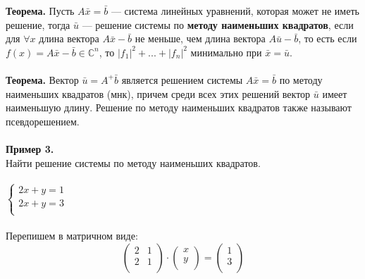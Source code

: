 \documentclass[12pt]{article}
\theoremstyle{definition}
\numberwithin{equation}{section}
\begin{document}
	\textbf{Теорема.}
	Пусть $A\bar x = \bar b$ --- система линейных уравнений, которая может не иметь решение, тогда $\bar u$ --- решение системы по \textbf{методу наименьших квадратов}, если для $\forall x$ длина вектора $A\bar x - \bar b$ не меньше, чем длина вектора $A\bar u - \bar b$, то есть если $f(x)=A\bar x - \bar b \in \mathbb{C}^n$, то $|f_1|^2+...+|f_n|^2$ минимально при $\bar x = \bar u$.\\
	\\
	\textbf{Теорема.}
	Вектор $\bar u = A^+ \bar b$ является решением системы $A\bar x = \bar b$ по методу наименьших квадратов (мнк), причем среди всех этих решений вектор $\bar u$ имеет наименьшую длину. Решение по методу наименьших квадратов также называют псевдорешением.\\
	\\
	\textbf{Пример 3.}\\ 
	Найти решение системы по методу наименьших квадратов.\\ \\
	$
	\left\{  
	\begin{array}{ccl}  
	2x+y=1\\
	2x+y=3\\
	\end{array}   
	\right.  
	$
	\\ 
	\\Перепишем в матричном виде:\\
	\[\begin{pmatrix}
	2 & 1 \\         
	2 & 1 \\
	\end{pmatrix} \cdot \begin{pmatrix}
	x \\         
	y \\
	\end{pmatrix} = \begin{pmatrix}
	1 \\         
	3 \\
	\end{pmatrix}\]\\
\end{document}
